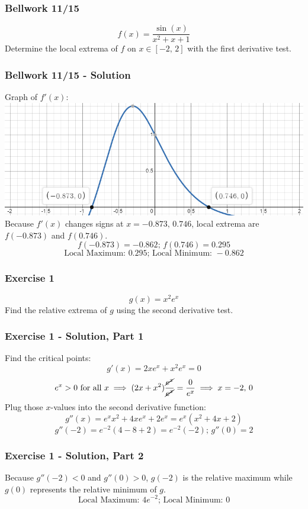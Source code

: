 \documentclass[12pt]{beamer}
\begin{document}
\begin{frame}
	\frametitle{Bellwork 11/15}
	\initclock

	\vfill
	\Large
	\[f(x)=\frac{\sin(x)}{x^2+x+1}\]
	\vfill
	\vfill
	Determine the local extrema of $f$ on $x\in[-2\text{, }2]$ with the first derivative test.
	\vfill
	\vfill
	\vfill
	\vfill
	\vfill
	\vfill

	\small
	\crono
\end{frame}
\begin{frame}
	\frametitle{Bellwork 11/15 - Solution}

	Graph of $f'(x)$:
	\includegraphics[scale=0.5]{exercise_1_solution_graph.png}
	\vfill
	Because $f'(x)$ changes signs at $x=-0.873\text{, }0.746$, local extrema are $f(-0.873)$ and $f(0.746)$.
	\[f(-0.873)=-0.862\text{; }f(0.746)=0.295\]
	\[\boxed{\text{Local Maximum: }0.295\text{; Local Minimum: }-0.862}\]
\end{frame}
\begin{frame}
	\frametitle{Exercise 1}

	\vfill
	\vfill
	\vfill
	\Large
	\[g(x)=x^2e^x\]
	\vfill
	Find the relative extrema of $g$ using the second derivative test.
	\vfill
	\vfill
	\vfill
\end{frame}
\begin{frame}
	\frametitle{Exercise 1 - Solution, Part 1}

	Find the critical points:
	\[g'(x)=2xe^x+x^2e^x=0\]
	\[\text{$e^x>0$ for all $x$}\implies (2x+x^2)\frac{\cancel{e^x}}{\cancel{e^x}}=\frac{0}{e^x}\implies x=-2\text{, }0\]
	Plug those $x$-values into the second derivative function:
	\[g''(x)=e^xx^2+4xe^x+2e^x=e^x(x^2+4x+2)\]
	\[g''(-2)=e^{-2}(4-8+2)=e^{-2}(-2)\text{; }g''(0)=2\]
\end{frame}
\begin{frame}
	\frametitle{Exercise 1 - Solution, Part 2}

	Because $g''(-2)<0$ and $g''(0)>0$, $g(-2)$ is the relative maximum while $g(0)$ represents the relative minimum of $g$.
	\[\boxed{\text{Local Maximum: }4e^{-2}\text{; Local Minimum: }0}\]
\end{frame}
\end{document}
